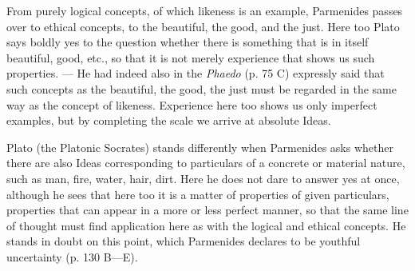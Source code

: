 \documentclass[12pt,a4paper,openany]{book}
\newcommand{\opage}[1]{\marginnote{\footnotesize\textit{[#1]}}}
\begin{document}
From purely logical concepts, of which likeness is an example,
Parmenides passes over to ethical concepts, to the
beautiful, the good, and the just. Here too Plato says
boldly yes to the question whether there is something that is in itself
beautiful, good, etc., so that it is not merely experience
that shows us such properties. --- He had indeed also
in the \textit{Phaedo} (p. 75 C) expressly said that such concepts
as the beautiful, the good, the just must be regarded
in the same way as the concept of likeness. Experience
here too shows us only imperfect examples, but by
completing the scale we arrive at absolute Ideas.

Plato (the Platonic Socrates) stands differently when
Parmenides asks whether there are also Ideas corresponding to particulars
of a concrete or material nature, such as man, fire, water,
hair, dirt. Here he does not dare to answer yes at once, although he
sees that here too it is a matter of properties of given
particulars, properties that can appear in a more
or less perfect manner, so that the same line of thought
\setcounter{footnote}{0}%
\opage{9}must find application here as with the logical and ethical
concepts. He stands in doubt on this point, which
Parmenides declares to be youthful uncertainty (p. 130
B---E).
\end{document}
